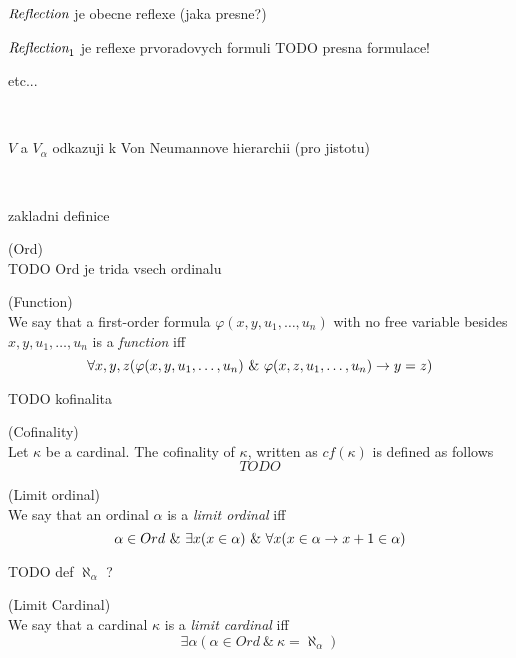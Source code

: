 \bce
\item $\emph{Reflection}$ je obecne reflexe (jaka presne?)
\item $\emph{Reflection}_1$ je reflexe prvoradovych formuli TODO presna formulace!
\item etc...
\ece

\

$V$ a $V_\alpha$ odkazuji k Von Neumannove hierarchii (pro jistotu)

\

zakladni definice

\begin{definition}{(Ord)}\\
TODO Ord je trida vsech ordinalu
\end{definition}

\begin{definition}{(Function)}\label{def:function}\\
We say that a first-order formula $\varphi(x, y, u_1, \ldots, u_n)$ with no free variable besides $x, y, u_1, \ldots, u_n$ is a \emph{function} iff
\begin{equation}
\forall x, y, z (\varphi(x, y, u_1, \ldots, u_n)\ \&\ \varphi(x, z, u_1, \ldots, u_n) \rightarrow y=z)
\end{equation}
\end{definition}

TODO kofinalita
\begin{definition}{(Cofinality)}\label{def:extensionality}\\
Let $\kappa$ be a cardinal. The {cofinality} of $\kappa$, written as $cf(\kappa)$ is defined as follows
\begin{equation}
TODO
\end{equation}
\end{definition}

\begin{definition}{(Limit ordinal)}\label{def:limit_ordinal}\\
We say that an ordinal $\alpha$ is a \emph{limit ordinal} iff
\begin{equation}
\alpha \in Ord\ \&\ \exists x (x\in\alpha)\ \&\ \forall x(x \in \alpha \rightarrow x+1 \in \alpha)
\end{equation}
\end{definition}

TODO def $\aleph_\alpha$ ?

\begin{definition}{(Limit Cardinal)}\label{def:limit_ordinal}\\
We say that a cardinal $\kappa$ is a \emph{limit cardinal} iff
\begin{equation}
\exists \alpha (\alpha \in Ord\ \&\ \kappa = \aleph_\alpha)
\end{equation}
\end{definition}

